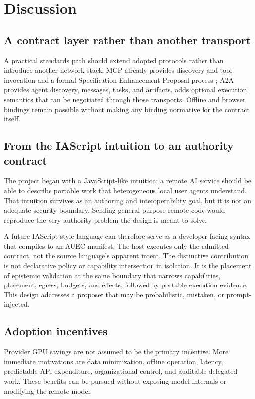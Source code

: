 \section{Discussion}
\label{sec:discussion}

\subsection{A contract layer rather than another transport}
A practical standards path should extend adopted protocols rather than introduce another network stack. MCP already provides discovery and tool invocation and a formal Specification Enhancement Proposal process \cite{MCPSEP2025}; A2A provides agent discovery, messages, tasks, and artifacts. \AUEC adds optional execution semantics that can be negotiated through those transports. Offline and browser bindings remain possible without making any binding normative for the contract itself.

\subsection{From the IAScript intuition to an authority contract}
The project began with a JavaScript-like intuition: a remote AI service should be able to describe portable work that heterogeneous local user agents understand. That intuition survives as an authoring and interoperability goal, but it is not an adequate security boundary. Sending general-purpose remote code would reproduce the very authority problem the design is meant to solve.

A future IAScript-style language can therefore serve as a developer-facing syntax that compiles to an AUEC manifest. The host executes only the admitted contract, not the source language's apparent intent. The distinctive contribution is not declarative policy or capability intersection in isolation. It is the placement of epistemic validation at the same boundary that narrows capabilities, placement, egress, budgets, and effects, followed by portable execution evidence. This design addresses a proposer that may be probabilistic, mistaken, or prompt-injected.

\subsection{Adoption incentives}
Provider GPU savings are not assumed to be the primary incentive. More immediate motivations are data minimization, offline operation, latency, predictable API expenditure, organizational control, and auditable delegated work. These benefits can be pursued without exposing model internals or modifying the remote model.

